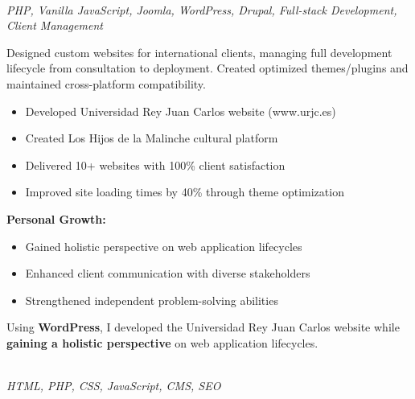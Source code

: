 \documentclass[a4paper,10pt]{article}
\begin{document}
{\begin{minipage}{\dimexpr\textwidth-2\fboxsep\relax}
		\vspace{0.4cm}


        \noindent\uline{} \\
        \vspace{0.1cm} \hspace{0.2cm}
		{\small\textit{PHP, Vanilla JavaScript, Joomla, WordPress, Drupal, Full-stack Development, Client Management}}

		Designed custom websites for international clients, managing full development lifecycle from consultation to deployment. Created optimized themes/plugins and maintained cross-platform compatibility.

		\vspace{0.2cm}
		\begin{itemize}[label=\textcolor{darkblue}{\textbullet}, leftmargin=*, nosep]
			\item Developed Universidad Rey Juan Carlos website (www.urjc.es)
			\item Created Los Hijos de la Malinche cultural platform
			\item Delivered 10+ websites with 100\% client satisfaction
			\item Improved site loading times by 40\% through theme optimization
		\end{itemize}

		\vspace{0.2cm}
		\textbf{Personal Growth:}
		\vspace{0.2cm}
		\begin{itemize}[label=\textcolor{darkblue}{\textbullet}, leftmargin=*, nosep]
			\item Gained holistic perspective on web application lifecycles
			\item Enhanced client communication with diverse stakeholders
			\item Strengthened independent problem-solving abilities
		\end{itemize}

        \vspace{0.2cm}


        Using \textbf{WordPress}, I developed the Universidad Rey Juan Carlos website
        while \textbf{gaining a holistic perspective} on web application lifecycles.

		\vspace{0.4cm}

        \noindent\uline{} \\
        \vspace{0.1cm} \hspace{0.2cm}
		{\small\textit{HTML, PHP, CSS, JavaScript, CMS, SEO}}


\end{minipage}}
\end{document}
